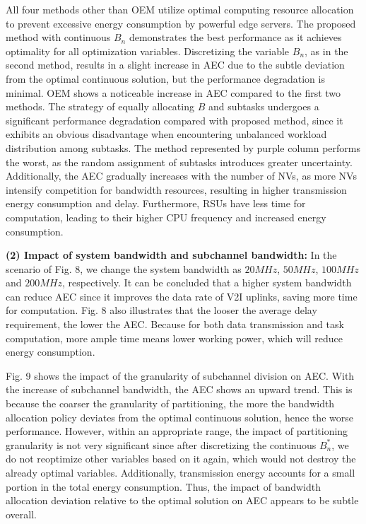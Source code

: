 \documentclass[lettersize,journal]{IEEEtran}
\begin{document}
All four methods other than OEM utilize optimal computing resource allocation to prevent excessive energy consumption by powerful edge servers. The proposed method with continuous $B_n$ demonstrates the best performance as it achieves optimality for all optimization variables. Discretizing the variable $B_n$, as in the second method, results in a slight increase in AEC due to the subtle deviation from the optimal continuous solution, but the performance degradation is minimal. OEM shows a noticeable increase in AEC compared to the first two methods. The strategy of equally allocating $B$ and subtasks undergoes a significant performance degradation compared with proposed method, since it exhibits an obvious disadvantage when encountering unbalanced workload distribution among subtasks. The method represented by purple column performs the worst, as the random assignment of subtasks introduces greater uncertainty. Additionally, the AEC gradually increases with the number of NVs, as more NVs intensify competition for bandwidth resources, resulting in higher transmission energy consumption and delay. Furthermore, RSUs have less time for computation, leading to their higher CPU frequency and increased energy consumption.


\textbf{(2) Impact of system bandwidth and subchannel bandwidth:} In the scenario of Fig. 8, we change the system bandwidth as $20 MHz$, $50 MHz$, $100 MHz$ and $200 MHz$, respectively. It can be concluded that a higher system bandwidth can reduce AEC since it improves the data rate of V2I uplinks, saving more time for computation. Fig. 8 also illustrates that the looser the average delay requirement, the lower the AEC. Because for both data transmission and task computation, more ample time means lower working power, which will reduce energy consumption.

Fig. 9 shows the impact of the granularity of subchannel division on AEC. With the increase of subchannel bandwidth, the AEC shows an upward trend. This is because the coarser the granularity of partitioning, the more the bandwidth allocation policy deviates from the optimal continuous solution, hence the worse performance. However, within an appropriate range, the impact of partitioning granularity is not very significant since after discretizing the continuous $B_n^*$, we do not reoptimize other variables based on it again, which would not destroy the already optimal variables. Additionally, transmission energy accounts for a small portion in the total energy consumption. Thus, the impact of bandwidth allocation deviation relative to the optimal solution on AEC appears to be subtle overall.
\end{document}
